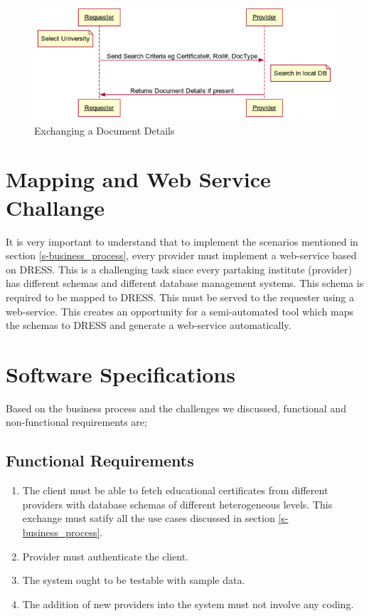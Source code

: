 \documentclass[12pt,a4paper,oneside]{book}
\begin{document}
\begin{figure}[!htp]
  \centering
  \includegraphics[width=14cm]{sq_exchange_doc.png}
  \caption{Exchanging a Document Details}
  \label{fig:sq_exchange_doc}
\end{figure}

\section{Mapping and Web Service Challange}

It is very important to understand that to implement the scenarios mentioned in section \ref{s-business_process}, every provider must implement a web-service based on DRESS. This is a challenging task since every partaking institute (provider) has different schemas and different database management systems. This schema is required to be mapped to DRESS. This must be served to the requester using a web-service. This creates an opportunity for a semi-automated tool which maps the schemas to DRESS and generate a web-service automatically.

\section{Software Specifications}\label{s-softspecs}
Based on the business process and the challenges we discussed, functional and non-functional requirements are;

    \subsection{Functional Requirements}
    
    \begin{enumerate}

		\item The client must be able to fetch educational certificates from different providers with database schemas of different heterogeneous levels. This exchange must satify all the use cases discussed in section \ref{s-business_process}.

		\item Provider must authenticate the client.
	
		\item The system ought to be testable with sample data.	
		
		\item The addition of new providers into the system must not involve any coding.

	\end{enumerate} 
\end{document}
